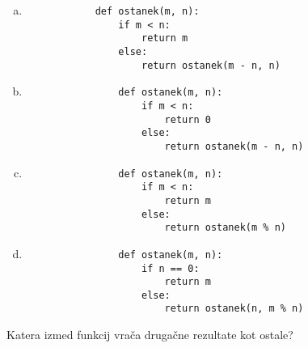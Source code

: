 \documentclass[arhiv, 10pt]{../izpit}
\begin{document}
        \begin{multicols}{2}
        \begin{enumerate}[(a)]
\item 
            \begin{verbatim}
            def ostanek(m, n):
                if m < n:
                    return m
                else:
                    return ostanek(m - n, n)
            \end{verbatim}
        
\item 
                \begin{verbatim}
                def ostanek(m, n):
                    if m < n:
                        return 0
                    else:
                        return ostanek(m - n, n)
                \end{verbatim}
            
\item 
                \begin{verbatim}
                def ostanek(m, n):
                    if m < n:
                        return m
                    else:
                        return ostanek(m % n)
                \end{verbatim}
            
\item 
                \begin{verbatim}
                def ostanek(m, n):
                    if n == 0:
                        return m
                    else:
                        return ostanek(n, m % n)
                \end{verbatim}
            
\end{enumerate}

        \end{multicols}
    
        \naloga*
        
        Katera izmed funkcij vrača drugačne rezultate kot ostale?
    
\end{document}
